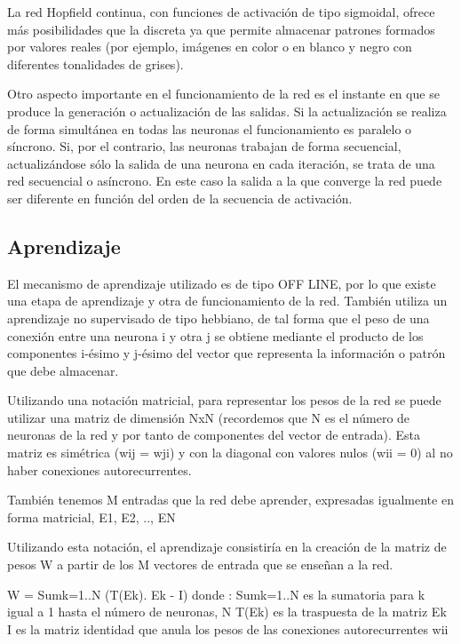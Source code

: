 \documentclass[letterpaper,12pt]{article}
\begin{document}
La red Hopfield continua, con funciones de activación de tipo sigmoidal, ofrece más posibilidades que la discreta ya que permite almacenar patrones formados por valores reales (por ejemplo, imágenes en color o en blanco y negro con diferentes tonalidades de grises).

Otro aspecto importante en el funcionamiento de la red es el instante en que se produce la generación o actualización de las salidas. Si la actualización se realiza de forma simultánea en todas las neuronas el funcionamiento es paralelo o síncrono. Si, por el contrario, las neuronas trabajan de forma secuencial, actualizándose sólo la salida de una neurona en cada iteración, se trata de una red secuencial o asíncrono. En este caso la salida a la que converge la red puede ser diferente en función del orden de la secuencia de activación.

\subsection{Aprendizaje}
El mecanismo de aprendizaje utilizado es de tipo OFF LINE, por lo que existe una etapa de aprendizaje y otra de funcionamiento de la red. También utiliza un aprendizaje no supervisado de tipo hebbiano, de tal forma que el peso de una conexión entre una neurona i y otra j se obtiene mediante el producto de los componentes i-ésimo y j-ésimo del vector que representa la información o patrón que debe almacenar.

Utilizando una notación matricial, para representar los pesos de la red se puede utilizar una matriz de dimensión NxN (recordemos que N es el número de neuronas de la red y por tanto de componentes del vector de entrada). Esta matriz es simétrica (wij = wji) y con la diagonal con valores nulos (wii = 0) al no haber conexiones autorecurrentes.

También tenemos M entradas que la red debe aprender, expresadas igualmente en forma matricial, E1, E2, .., EN

Utilizando esta notación, el aprendizaje consistiría en la creación de la matriz de pesos W a partir de los M vectores de entrada que se enseñan a la red.

\begin{center}
    
W = Sumk=1..N (T(Ek). Ek - I)
\newline 
donde :	Sumk=1..N es la sumatoria para k igual a 1 hasta el número de neuronas, N T(Ek) es la traspuesta de la matriz Ek I es la matriz identidad que anula los pesos de las conexiones autorecurrentes wii
\end{center}
\end{document}
